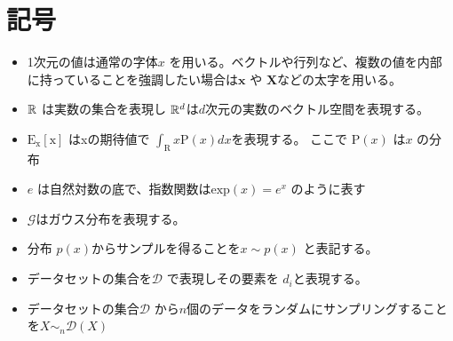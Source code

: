 \chapter*{記号}
\label{thanks}


\begin{itemize}
    \item 1次元の値は通常の字体$ x $ を用いる。ベクトルや行列など、複数の値を内部に持っていることを強調したい場合は$ \mathbf{x} $ や $ \mathbf{X} $などの太字を用いる。
    \item $\mathbb{R}$ は実数の集合を表現し $\mathbb{R}^d$は$ d $次元の実数のベクトル空間を表現する。 
    \item $\mathrm{E_x[x]}$ はxの期待値で $ \int_{\mathrm{R}} x \mathrm{P}(x) dx $を表現する。 ここで $ \mathrm{P}(x) $ は$ x $ の分布
    \item $e$ は自然対数の底で、指数関数は$\mathrm{exp}(x) = e^x$ のように表す
    \item $ \mathcal{G} $はガウス分布を表現する。
    \item 分布 $p(x)$からサンプルを得ることを$ x \sim p(x) $ と表記する。
    \item データセットの集合を$ \mathcal{D} $ で表現しその要素を $ d_i $と表現する。
    \item データセットの集合$ \mathcal{D} $ から$ n $個のデータをランダムにサンプリングすることを$ X \sim_n \mathcal{D}(X) $ 

\end{itemize}